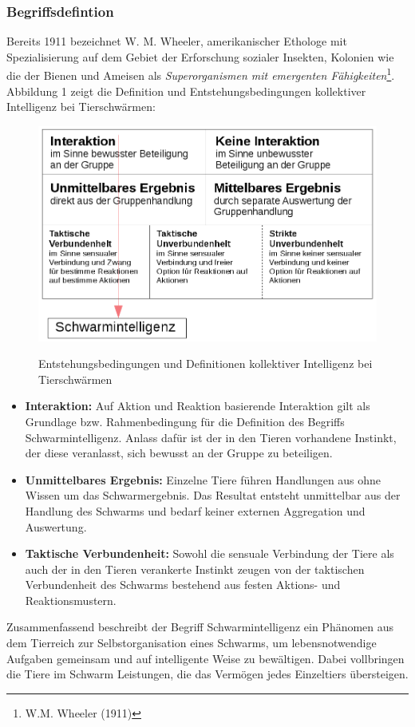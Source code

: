 \documentclass[a4paper, 11pt]{article}
\begin{document}
\subsubsection{Begriffsdefintion}
Bereits 1911 bezeichnet W. M. Wheeler, amerikanischer Ethologe mit Spezialisierung auf dem Gebiet der Erforschung sozialer Insekten, Kolonien wie die der Bienen und Ameisen als \textit{Superorganismen mit emergenten Fähigkeiten}\footnote{W.M. Wheeler (1911)}. Abbildung 1 zeigt die Definition und Entstehungsbedingungen kollektiver Intelligenz bei Tierschwärmen:\newline
\begin{figure}[h]
	\begin{center}
	\includegraphics[width=1\textwidth]{schwarmintelligenz}
		\label{defabb}
	\end{center}
	\hspace{1in}\parbox{4in}{\caption[Entstehungsbedingungen und Definitionen kollektiver Intelligenz bei Tierschwärmen]{Entstehungsbedingungen und Definitionen kollektiver Intelligenz bei Tierschwärmen\footnotemark}}
\end{figure}
\begin{itemize}
	\item \textbf{Interaktion:} Auf Aktion und Reaktion basierende Interaktion gilt als Grundlage bzw. Rahmenbedingung für die Definition des Begriffs Schwarmintelligenz. Anlass dafür ist der in den Tieren vorhandene Instinkt, der diese veranlasst, sich bewusst an der Gruppe zu beteiligen.
	\item \textbf{Unmittelbares Ergebnis:} Einzelne Tiere führen Handlungen aus ohne Wissen um das Schwarmergebnis. Das Resultat entsteht unmittelbar aus der Handlung des Schwarms und bedarf keiner externen Aggregation und Auswertung.
	\item \textbf{Taktische Verbundenheit:} Sowohl die sensuale Verbindung der Tiere als auch der in den Tieren verankerte Instinkt zeugen von der taktischen Verbundenheit des Schwarms bestehend aus festen Aktions- und Reaktionsmustern. 
\end{itemize}
\par Zusammenfassend beschreibt der Begriff Schwarmintelligenz ein Phänomen aus dem Tierreich zur Selbstorganisation eines Schwarms, um lebensnotwendige Aufgaben gemeinsam und auf intelligente Weise zu bewältigen. Dabei vollbringen die Tiere im Schwarm Leistungen, die das Vermögen jedes Einzeltiers übersteigen.
\end{document}
